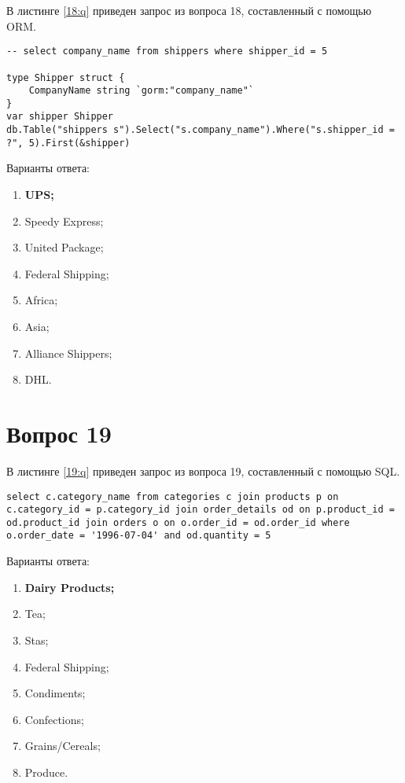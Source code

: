 \begin{appendices}
В листинге \ref{18:q} приведен запрос из вопроса 18, составленный с помощью ORM.

\begin{lstlisting}[label=18:q,caption=Вопрос 18]
-- select company_name from shippers where shipper_id = 5

type Shipper struct {
	CompanyName string `gorm:"company_name"`
}
var shipper Shipper
db.Table("shippers s").Select("s.company_name").Where("s.shipper_id = ?", 5).First(&shipper)
\end{lstlisting}

Варианты ответа:

\begin{enumerate}
	\item \textbf{UPS;}
	\item Speedy Express;
	\item United Package;
	\item Federal Shipping;
	\item Africa;
	\item Asia;
	\item Alliance Shippers;
	\item DHL.
\end{enumerate}

\section{Вопрос 19}

В листинге \ref{19:q} приведен запрос из вопроса 19, составленный с помощью SQL.

\begin{lstlisting}[label=19:q,caption=Вопрос 19]
select c.category_name from categories c join products p on c.category_id = p.category_id join order_details od on p.product_id = od.product_id join orders o on o.order_id = od.order_id where o.order_date = '1996-07-04' and od.quantity = 5
\end{lstlisting}

Варианты ответа:

\begin{enumerate}
	\item \textbf{Dairy Products;}
	\item Tea;
	\item Stas;
	\item Federal Shipping;
	\item Condiments;
	\item Confections;
	\item Grains/Cereals;
	\item Produce.
\end{enumerate}


\end{appendices}
